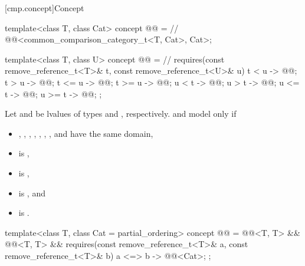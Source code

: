 [cmp.concept]{Concept }

\begin{codeblock}
template<class T, class Cat>
  concept @@ =                 // \expos
    @@<common_comparison_category_t<T, Cat>, Cat>;

template<class T, class U>
  concept @@ =      // \expos
    requires(const remove_reference_t<T>& t, const remove_reference_t<U>& u) {
      { t <  u } -> @@;
      { t >  u } -> @@;
      { t <= u } -> @@;
      { t >= u } -> @@;
      { u <  t } -> @@;
      { u >  t } -> @@;
      { u <= t } -> @@;
      { u >= t } -> @@;
    };
\end{codeblock}

\pnum
Let  and  be
lvalues of types  and
, respectively.
 and  model
 only if
\begin{itemize}
\item
  ,
  ,
  ,
  ,
  ,
  ,
  , and
  have the same domain,
\item
   is ,
\item
   is ,
\item
   is , and
\item
   is .
\end{itemize}

\begin{codeblock}
template<class T, class Cat = partial_ordering>
  concept @@ =
    @@<T, T> &&
    @@<T, T> &&
    requires(const remove_reference_t<T>& a, const remove_reference_t<T>& b) {
      { a <=> b } -> @@<Cat>;
    };
\end{codeblock}

